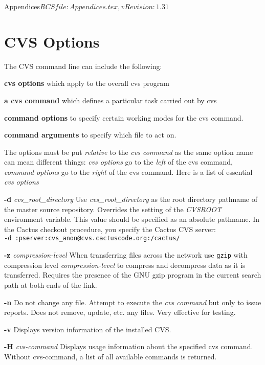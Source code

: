 \begin{cactuspart}{6}{Appendices}{$RCSfile: Appendices.tex,v $}{$Revision: 1.31 $}
\section{CVS Options}
The CVS command line can include the following:
\begin{Lentry}
\item[{\bf cvs options}] which apply to the overall cvs program
\item[{\bf a cvs command}]  which defines a particular task carried out by
cvs
\item[{\bf command options}] to specify certain working modes for the cvs
command.
\item[{\bf command arguments}] to specify which file to act on.
\end{Lentry}

The options must be put {\em relative} to the {\it cvs command} as the
same option name can mean different things: {\em cvs options} go to the
{\em left} of the cvs command, {\em command options} go to the {\em right}
of the cvs command. Here is a list of essential {\em cvs options}

\begin{Lentry}

\item[{\bf -d} {\em cvs\_root\_directory}]
Use {\em cvs\_root\_directory} as the root directory  pathname  of
the  master source repository.  Overrides
the setting of the  {\em CVSROOT}  environment  variable.
This value should be specified as an absolute pathname.
In the Cactus checkout procedure, you specify the Cactus CVS server:\\
{\tt -d :pserver:cvs\_anon@cvs.cactuscode.org:/cactus/}

\item[{\bf -z} {\em compression-level}]
When transferring files across the network use {\tt gzip}
with compression level  {\em compression-level}  to  compress  and
decompress  data as it is transferred.
Requires the presence of the GNU gzip  program  in
the current search path at both ends of the link.

\item[{\bf -n}]
Do not change any file. Attempt to execute the {\em cvs command} but
only to issue reports. Does not remove, update, etc. any files. Very
effective for testing.

\item[{\bf -v}]
Displays version information of the installed CVS.

\item[{\bf -H} {\em cvs-command}]
Displays usage information about the specified cvs command. Without
cvs-command, a list of all available commands is returned.
\end{Lentry}


\end{cactuspart}
